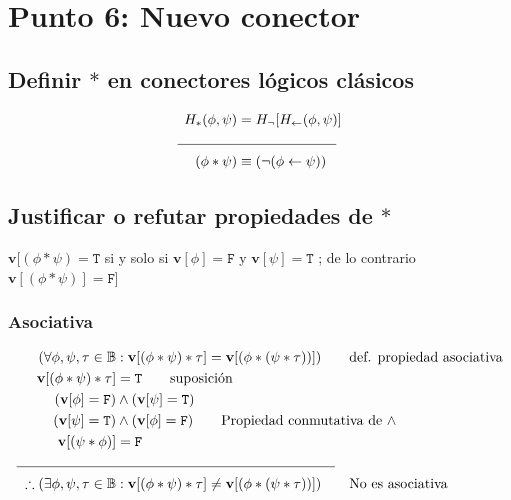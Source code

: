 \documentclass{article}
\begin{document}
\section{Punto 6: Nuevo conector}
\subsection{Definir $*$ en conectores lógicos clásicos}
\begin{alignat*}{2}
    H_{*}(\phi, \psi) &= H_{\lnot}[H_{\gets}(\phi, \psi)]\\
    \makebox[1.5cm]{\hrulefill}&\makebox[2.5cm]{\hrulefill}\\
    (\phi * \psi) &\equiv (\lnot (\phi \gets \psi))
\end{alignat*}

\subsection{Justificar o refutar propiedades de $*$}
\begin{tcolorbox}[metateorema, title = Metateorema 2.23 para $*$]
        \vspace*{1cm}
        $\mathbf{v}[(\phi * \psi) = \mathtt{T}$ si y solo si $\mathbf{v}[\phi] = \mathtt{F}$ y $\mathbf{v}[\psi] = \mathtt{T}$ ; de lo contrario $\mathbf{v}[(\phi * \psi)] = \mathtt{F}$]
\end{tcolorbox}
\subsubsection{Asociativa}

\begin{alignat*}{2}
    (\forall \phi, \psi, \tau \in \mathbb{B} &: \mathbf{v}[(\phi * \psi) * \tau] = \mathbf{v}[(\phi * (\psi	 * \tau))]) \tag*{def. propiedad asociativa}\\
    \mathbf{v}[(\phi * \psi) * \tau] &= \mathtt{T} \tag*{suposición}\\
    (\mathbf{v}[\phi] = \mathtt{F}) &\wedge (\mathbf{v}[\psi] = \mathtt{T})\\
    (\mathbf{v}[\psi] = \mathtt{T}) &\wedge (\mathbf{v}[\phi] = \mathtt{F}) \tag*{Propiedad conmutativa de $\wedge$}\\
    \mathbf{v}[(\psi * \phi)] &= \mathtt{F}\\
    \makebox[2.5cm]{\hrulefill}&\makebox[5.5cm]{\hrulefill}\\
    \therefore (\exists \phi, \psi, \tau \in \mathbb{B} &: \mathbf{v}[(\phi * \psi) * \tau] \not= \mathbf{v}[(\phi * (\psi * \tau))]) \tag*{No es asociativa}
\end{alignat*}
\end{document}
